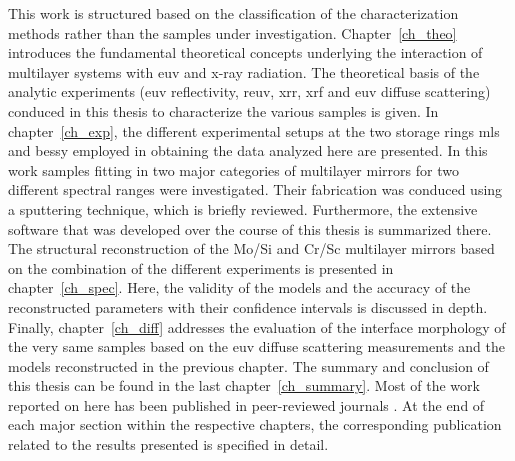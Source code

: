 This work is structured based on the classification of the characterization methods rather than the samples under investigation. Chapter~\ref{ch_theo} introduces the fundamental theoretical concepts underlying the interaction of multilayer systems with \gls{euv} and x-ray radiation. The theoretical basis of the analytic experiments (\gls{euv} reflectivity, \gls{reuv}, \gls{xrr}, \gls{xrf} and \gls{euv} diffuse scattering) conduced in this thesis to characterize the various samples is given. In chapter~\ref{ch_exp}, the different experimental setups at the two storage rings \gls{mls} and \gls{bessy} employed in obtaining the data analyzed here are presented. In this work samples fitting in two major categories of multilayer mirrors for two different spectral ranges were investigated. Their fabrication was conduced using a sputtering technique, which is briefly reviewed. Furthermore, the extensive software that was developed over the course of this thesis is summarized there. The structural reconstruction of the Mo/Si and Cr/Sc multilayer mirrors based on the combination of the different experiments is presented in chapter~\ref{ch_spec}. Here, the validity of the models and the accuracy of the reconstructed parameters with their confidence intervals is discussed in depth. Finally, chapter~\ref{ch_diff} addresses the evaluation of the interface morphology of the very same samples based on the \gls{euv} diffuse scattering measurements and the models reconstructed in the previous chapter. The summary and conclusion of this thesis can be found in the last chapter~\ref{ch_summary}. Most of the work reported on here has been published in peer-reviewed journals \cite{haase_role_2014, haase_multiparameter_2016, haase_interface_2017}. At the end of each major section within the respective chapters, the corresponding publication related to the results presented is specified in detail.
